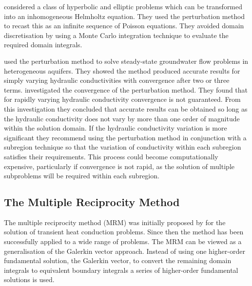  considered a class of hyperbolic and elliptic
problems which can be transformed into an inhomogeneous Helmholtz equation.
They used the perturbation method to recast this as an infinite sequence of
Poisson equations. They avoided domain discretisation by using a Monte
Carlo integration technique \cite{gipson:1987} to evaluate the required
domain integrals.

 used the perturbation method to solve
steady-state groundwater flow problems in heterogeneous aquifers.  They
showed the method produced accurate results for simply varying hydraulic
conductivities with convergence after two or three terms.
 investigated the convergence of the perturbation
method.  They found that for rapidly varying hydraulic conductivity
convergence is not guaranteed.  From this investigation they concluded that
accurate results can be obtained so long as the hydraulic conductivity does
not vary by more than one order of magnitude within the solution domain.
If the hydraulic conductivity variation is more significant they recommend
using the perturbation method in conjunction with a subregion technique so
that the variation of conductivity within each subregion satisfies their
requirements.  This process could become computationally expensive,
particularly if convergence is not rapid, as the solution of multiple
subproblems will be required within each subregion.

\subsection{The Multiple Reciprocity Method}

The multiple reciprocity method 
  (MRM) was
initially proposed by  for the solution of transient
heat conduction problems.  Since then the method has been successfully applied
to a wide range of problems.  The MRM can be viewed as a generalisation of the
Galerkin vector approach.  Instead of using one higher-order fundamental
solution, the Galerkin vector, to convert the remaining domain integrals to
equivalent boundary integrals a series of higher-order fundamental solutions
is used.

